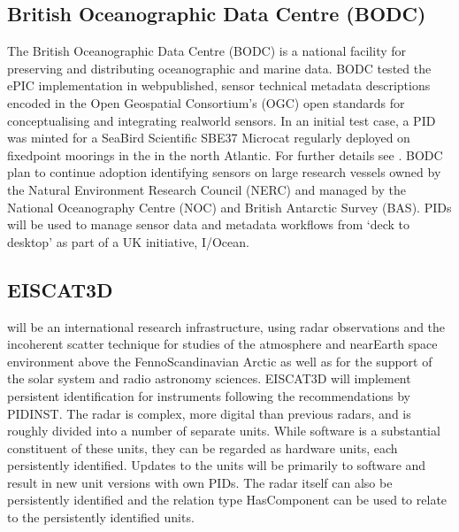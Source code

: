 \documentclass[a4paper,10pt,english]{sphinxmanual}
\begin{document}
\subsection{British Oceanographic Data Centre (BODC)}
\label{\detokenize{white-paper/adoption:british-oceanographic-data-centre-bodc}}
\sphinxAtStartPar
The British Oceanographic Data Centre (BODC) is a national facility
for preserving and distributing oceanographic and marine data.  BODC
tested the ePIC implementation in web\sphinxhyphen{}published, sensor technical
metadata descriptions encoded in the Open Geospatial Consortium’s
(OGC)  open standards for conceptualising and integrating
real\sphinxhyphen{}world sensors.  In an initial test case, a PID was minted for a
Sea\sphinxhyphen{}Bird Scientific SBE37 Microcat regularly deployed on fixed\sphinxhyphen{}point
moorings in the  in the north Atlantic.  For further details see
{\hyperref[\detokenize{white-paper/landing-page-encoding:landing-page-encoding-swe}]{}}.  BODC plan to continue adoption
identifying sensors on large research vessels owned by the Natural
Environment Research Council (NERC) and managed by the National
Oceanography Centre (NOC) and British Antarctic Survey (BAS).  PIDs
will be used to manage sensor data and metadata workflows from ‘deck
to desktop’ as part of a UK initiative, I/Ocean.


\subsection{EISCAT3D}
\label{\detokenize{white-paper/adoption:eiscat3d}}
\sphinxAtStartPar
{} will be an international research infrastructure, using
radar observations and the incoherent scatter technique for studies of
the atmosphere and near\sphinxhyphen{}Earth space environment above the
Fenno\sphinxhyphen{}Scandinavian Arctic as well as for the support of the solar
system and radio astronomy sciences.  EISCAT3D will implement
persistent identification for instruments following the
recommendations by PIDINST.  The radar is complex, more digital than
previous radars, and is roughly divided into a number of separate
units.  While software is a substantial constituent of these units,
they can be regarded as hardware units, each persistently identified.
Updates to the units will be primarily to software and result in new
unit versions with own PIDs.  The radar itself can also be
persistently identified and the relation type HasComponent can be used
to relate to the persistently identified units.
\end{document}

